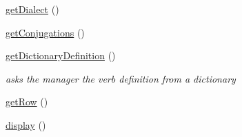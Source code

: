 \begin{DoxyCompactItemize}
\hyperlink{class_conjugation_base_a5010621a363fcfe26e5d23ade06d2c41}{get\+Dialect} ()
\item 
\hyperlink{class_conjugation_base_ae5b10d1201dfc7ed1c56b1f5a073bbdb}{get\+Conjugations} ()
\item 
\hyperlink{class_conjugation_base_aae493e154b07045a3ea072760ac44ef4}{get\+Dictionary\+Definition} ()
\begin{DoxyCompactList}\small\item\em asks the manager the verb definition from a dictionary \end{DoxyCompactList}\item 
\hyperlink{class_conjugation_base_a0a30ad37c192a95d0986b77999a2ce5d}{get\+Row} ()
\item 
\hyperlink{class_conjugation_base_a7a50c953a3f949a7740d3fb51c4b929d}{display} ()
\end{DoxyCompactItemize}
